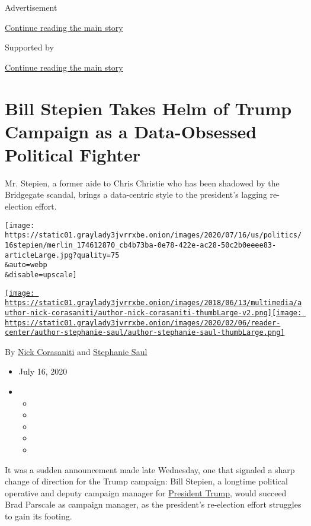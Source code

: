 Advertisement

\protect\hyperlink{after-top}{Continue reading the main story}

Supported by

\protect\hyperlink{after-sponsor}{Continue reading the main story}

\hypertarget{bill-stepien-takes-helm-of-trump-campaign-as-a-data-obsessed-political-fighter}{%
\section{Bill Stepien Takes Helm of Trump Campaign as a Data-Obsessed
Political
Fighter}\label{bill-stepien-takes-helm-of-trump-campaign-as-a-data-obsessed-political-fighter}}

Mr. Stepien, a former aide to Chris Christie who has been shadowed by
the Bridgegate scandal, brings a data-centric style to the president's
lagging re-election effort.

\texttt{[image: https://static01.graylady3jvrrxbe.onion/images/2020/07/16/us/politics/16stepien/merlin\_174612870\_cb4b73ba-0e78-422e-ac28-50c2b0eeee83-articleLarge.jpg?quality=75\\\&auto=webp\\\&disable=upscale]}

\href{https://www.nytimes3xbfgragh.onion/by/nick-corasaniti}{\texttt{[image: https://static01.graylady3jvrrxbe.onion/images/2018/06/13/multimedia/author-nick-corasaniti/author-nick-corasaniti-thumbLarge-v2.png]}}\href{https://www.nytimes3xbfgragh.onion/by/stephanie-saul}{\texttt{[image: https://static01.graylady3jvrrxbe.onion/images/2020/02/06/reader-center/author-stephanie-saul/author-stephanie-saul-thumbLarge.png]}}

By \href{https://www.nytimes3xbfgragh.onion/by/nick-corasaniti}{Nick
Corasaniti} and
\href{https://www.nytimes3xbfgragh.onion/by/stephanie-saul}{Stephanie
Saul}

\begin{itemize}
\item
  July 16, 2020
\item
  \begin{itemize}
  \item
  \item
  \item
  \item
  \item
  \end{itemize}
\end{itemize}

It was a sudden announcement made late Wednesday, one that signaled a
sharp change of direction for the Trump campaign: Bill Stepien, a
longtime political operative and deputy campaign manager for
\href{https://www.nytimes3xbfgragh.onion/interactive/2020/us/elections/donald-trump.html}{President
Trump}, would succeed Brad Parscale as campaign manager, as the
president's re-election effort struggles to gain its footing.

